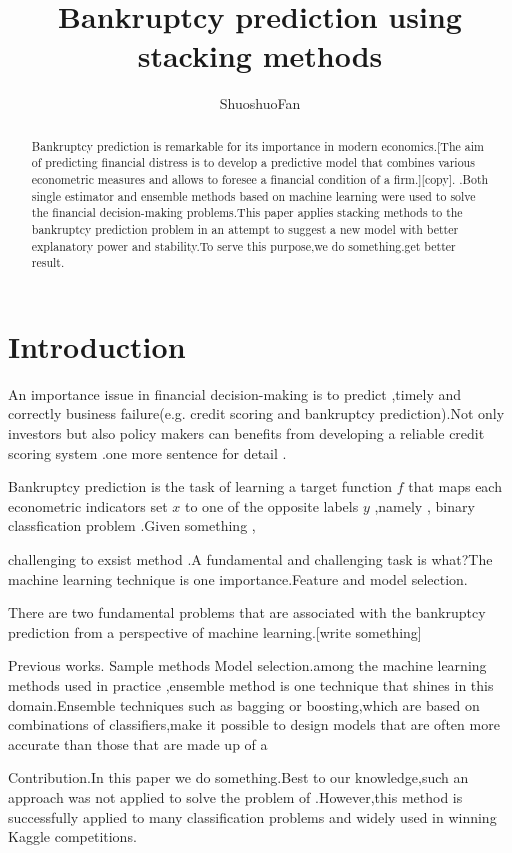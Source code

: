 \documentclass[a4paper]{article}
\title{Bankruptcy prediction using stacking methods }
\author{ShuoshuoFan}
\begin{document}
\maketitle

\begin{abstract}
Bankruptcy prediction is remarkable for its importance in modern economics.[The aim of predicting financial distress is 
to develop a predictive model that combines various econometric measures and allows to foresee a financial condition of a firm.][copy].
 .Both single estimator and ensemble methods based on machine learning were used to solve the financial decision-making problems.This paper applies stacking methods to the bankruptcy prediction problem in an attempt to suggest a new model with better explanatory power
and stability.To serve this purpose,we do something.get better result.
\end{abstract}

\section{Introduction}
An importance issue in financial decision-making is to predict ,timely and correctly business failure(e.g. credit scoring and bankruptcy prediction).Not only investors but also policy makers can  benefits from developing a reliable credit scoring system .one more sentence for detail .

Bankruptcy prediction is the task of  learning a target function $f$ that maps each econometric indicators set $x$ to  one of the opposite labels $y$ ,namely , binary classfication problem .Given something ,

challenging to exsist method .A fundamental and challenging task is what?The machine learning technique is one importance.Feature and model selection.
 
There are two fundamental problems  that are associated with the bankruptcy prediction from a perspective of  machine learning.[write something]

Previous works.
Sample methods
Model selection.among the machine learning methods used in practice ,ensemble method is one technique that shines in this domain.Ensemble techniques such as bagging or
boosting,which are based on combinations  of  classifiers,make it possible  to design models that are often more accurate than those that are made up of a 

Contribution.In this paper we do something.Best to our knowledge,such an approach was not applied to solve the problem of .However,this method is successfully applied to many classification problems and widely used in winning  Kaggle competitions.
\end{document}
